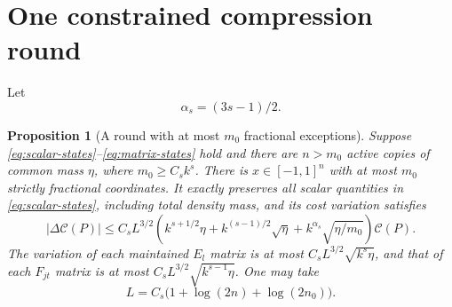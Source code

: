 \documentclass[11pt]{article}
\newtheorem{proposition}[theorem]{Proposition}
\theoremstyle{remark}\newtheorem{remark}[theorem]{Remark}
\newcommand{\cost}{\mathcal C}\newcommand{\OPT}{\mathsf{OPT}}
\begin{document}
\section{One constrained compression round}\label{sec:round}
Let
\[
 \alpha_s=(3s-1)/2.
\]
\begin{proposition}[A round with at most $m_0$ fractional exceptions]\label{prop:round}
Suppose \eqref{eq:scalar-states}--\eqref{eq:matrix-states} hold and there are $n>m_0$ active copies of common mass $\eta$, where $m_0\ge C_s k^s$. There is $x\in[-1,1]^n$ with at most $m_0$ strictly fractional coordinates. It exactly preserves all scalar quantities in \eqref{eq:scalar-states}, including total density mass, and its cost variation satisfies
\begin{equation}\label{eq:one-round}
 |\Delta\cost(P)|\le C_s L^{3/2}
 \left(k^{s+1/2}\eta+k^{(s-1)/2}\sqrt\eta+
 k^{\alpha_s}\sqrt{\eta/m_0}\right)\cost(P).
\end{equation}
The variation of each maintained $E_l$ matrix is at most $C_sL^{3/2}\sqrt{k^s\eta}$, and that of each $F_{jt}$ matrix is at most $C_sL^{3/2}\sqrt{k^{s-1}\eta}$. One may take
\[
 L=C_s\bigl(1+\log(2n)+\log(2n_0)\bigr).
\]
\end{proposition}
\end{document}
